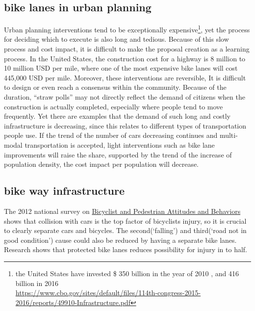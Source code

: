 \subsection{bike lanes in urban planning}
Urban planning interventions tend to be exceptionally expensive\footnote{the United States have invested \$ 350 billion in the year of 2010 \cite{musick2010public}, and 416 billion in 2016\\ \url{https://www.cbo.gov/sites/default/files/114th-congress-2015-2016/reports/49910-Infrastructure.pdf}}, yet the process for deciding which to execute is also long and tedious. Because of this slow process and cost impact, it is difficult to make the proposal creation as a learning process. In the United States, the construction cost for a highway is 8 million to 10 million USD per mile, where one of the most expensive bike lanes will cost 445,000 USD per mile. Moreover, these interventions are reversible, 
 It is difficult to design or even reach a consensus within the community. Because of the duration, ``straw polls'' may not directly reflect the demand of citizens when the construction is actually completed, especially where people tend to move frequently. Yet there are examples that the demand of such long and costly infrastructure is decreasing, since this relates to different types of transportation people use. If the trend of the number of cars decreasing continues and multi-modal transportation is accepted, light interventions such as bike lane improvements will raise the share, supported by the trend of the increase of population density, the cost impact per population will decrease.

\subsection{bike way infrastructure}

The 2012 national survey on \underline{Bicyclist and Pedestrian Attitudes and Behaviors} shows that collision with cars is the top factor of bicyclists injury\cite{schroeder20132012}, so it is crucial to clearly separate cars and bicycles. The second(`falling') and third(`road not in good condition') cause could also be reduced by having a separate bike lanes. Research shows that protected bike lanes reduces possibility for injury in to half.\cite{teschke2012route}

